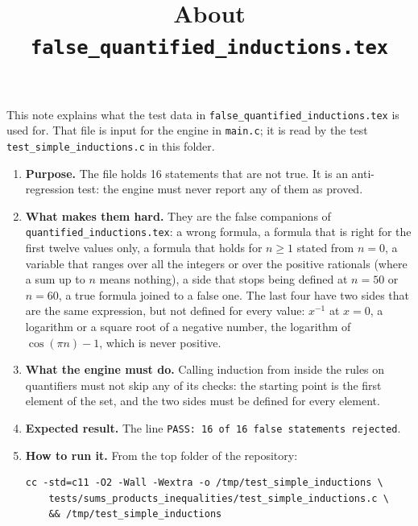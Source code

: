 \documentclass[11pt,a4paper]{article}
\title{About \texttt{false\_quantified\_inductions.tex}}
\author{}
\date{}
\begin{document}
\maketitle
This note explains what the test data in \texttt{false\_quantified\_inductions.tex} is used for. That file is input for the engine in \texttt{main.c}; it is read by the test \texttt{test\_simple\_inductions.c} in this folder.

\begin{enumerate}
\item \textbf{Purpose.} The file holds 16 statements that are not true. It is an anti-regression test: the engine must never report any of them as proved.

\item \textbf{What makes them hard.} They are the false companions of \texttt{quantified\_inductions.tex}: a wrong formula, a formula that is right for the first twelve values only, a formula that holds for $n \ge 1$ stated from $n = 0$, a variable that ranges over all the integers or over the positive rationals (where a sum up to $n$ means nothing), a side that stops being defined at $n = 50$ or $n = 60$, a true formula joined to a false one. The last four have two sides that are the same expression, but not defined for every value: $x^{-1}$ at $x = 0$, a logarithm or a square root of a negative number, the logarithm of $\cos(\pi n) - 1$, which is never positive.

\item \textbf{What the engine must do.} Calling induction from inside the rules on quantifiers must not skip any of its checks: the starting point is the first element of the set, and the two sides must be defined for every element.

\item \textbf{Expected result.} The line \texttt{PASS: 16 of 16 false statements rejected}.

\item \textbf{How to run it.} From the top folder of the repository:
\begin{verbatim}
cc -std=c11 -O2 -Wall -Wextra -o /tmp/test_simple_inductions \
    tests/sums_products_inequalities/test_simple_inductions.c \
    && /tmp/test_simple_inductions
\end{verbatim}
\end{enumerate}
\end{document}
